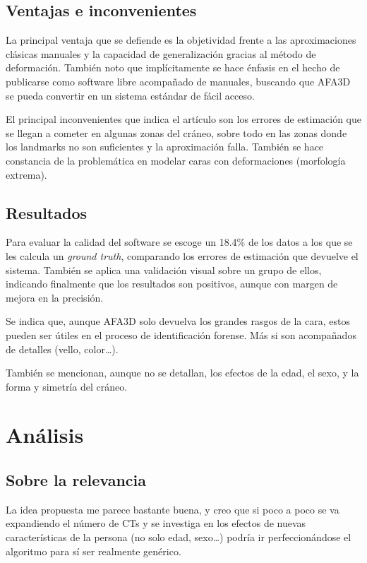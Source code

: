 \documentclass[13pt,a4paper]{article}
\begin{document}
\subsection{Ventajas e inconvenientes}

La principal ventaja que se defiende es la objetividad frente a las aproximaciones clásicas manuales y la capacidad de generalización gracias al método de deformación. También noto que implícitamente se hace énfasis en el hecho de publicarse como software libre acompañado de manuales, buscando que AFA3D se pueda convertir en un sistema estándar de fácil acceso.

\vspace{\baselineskip}

El principal inconvenientes que indica el artículo son los errores de estimación que se llegan a cometer en algunas zonas del cráneo, sobre todo en las zonas donde los landmarks no son suficientes y la aproximación falla. También se hace constancia de la problemática en modelar caras con deformaciones (morfología extrema).

\subsection{Resultados}

Para evaluar la calidad del software se escoge un 18.4\% de los datos a los que se les calcula un \textit{ground truth}, comparando los errores de estimación que devuelve el sistema.
También se aplica una validación visual sobre un grupo de ellos, indicando finalmente que los resultados son positivos, aunque con margen de mejora en la precisión. 

Se indica que, aunque AFA3D solo devuelva los grandes rasgos de la cara, estos pueden ser útiles en el proceso de identificación forense. Más si son acompañados de detalles (vello, color\dots).

También se mencionan, aunque no se detallan, los efectos de la edad, el sexo, y la forma y simetría del cráneo.

\section{Análisis}

\subsection{Sobre la relevancia}

La idea propuesta me parece bastante buena, y creo que si poco a poco se va expandiendo el número de CTs y se investiga en los efectos de nuevas características de la persona (no solo edad, sexo\dots) podría ir perfeccionándose el algoritmo para sí ser realmente genérico.
\end{document}
